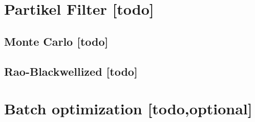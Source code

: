 

\begin{comment}
------------------------------------------------------------------------------------------
\end{comment}
\section{Partikel Filter [todo]}

\begin{comment}
------------------------------------------------------------------------------------------
- \cite{kurth2003experimental}
	- Monte Carlo localization, or particle ltering, provides a method of representing multimodal distri-butions for position estimation [4, 12], with the ad-vantage that the computational requirements can be scaled. The main advantage of these methods is their ability to recover robustly from a poor initial condition.
- \cite{fox1999monte}
\end{comment}
\subsection{Monte Carlo [todo]}


\begin{comment}
------------------------------------------------------------------------------------------
Rao-Blackwellized Particle Filtering
https://people.eecs.berkeley.edu/~pabbeel/cs287-fa12/slides/RBPF.pdf
\end{comment}
\subsection{Rao-Blackwellized [todo]}


\begin{comment}
------------------------------------------------------------------------------------------
- \cite{kurth2003experimental}
	- We are currently developing a batch localization method, which considers all the data collected by the robot and nds the best path estimate given all the data. Although time consuming computationally, this will produce the theoretically optimal result obtainable from the collected data; we can then evaluate the results of our online localization method by comparing to this optimal solution.
\end{comment}
\section{Batch optimization [todo,optional]}


